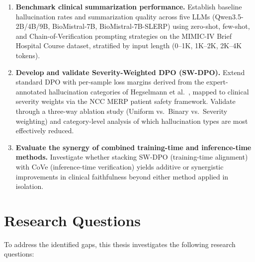 \documentclass[12pt,a4paper,oneside]{report}
\begin{document}
\begin{enumerate}[label=\textbf{RO\arabic*:}, leftmargin=3em]
    \item \textbf{Benchmark clinical summarization performance.} Establish baseline hallucination rates and summarization quality across five LLMs (Qwen3.5-2B/4B/9B, BioMistral-7B, BioMistral-7B-SLERP) using zero-shot, few-shot, and Chain-of-Verification prompting strategies on the MIMIC-IV Brief Hospital Course dataset, stratified by input length (0--1K, 1K--2K, 2K--4K tokens).
    
    \item \textbf{Develop and validate Severity-Weighted DPO (SW-DPO).} Extend standard DPO with per-sample loss margins derived from the expert-annotated hallucination categories of Hegselmann et al.~\cite{hegselmann2024datacentric}, mapped to clinical severity weights via the NCC MERP patient safety framework. Validate through a three-way ablation study (Uniform vs.\ Binary vs.\ Severity weighting) and category-level analysis of which hallucination types are most effectively reduced.
    
    \item \textbf{Evaluate the synergy of combined training-time and inference-time methods.} Investigate whether stacking SW-DPO (training-time alignment) with CoVe (inference-time verification) yields additive or synergistic improvements in clinical faithfulness beyond either method applied in isolation.
\end{enumerate}

\section{Research Questions}
\label{sec:research-questions}

To address the identified gaps, this thesis investigates the following research questions:
\end{document}
